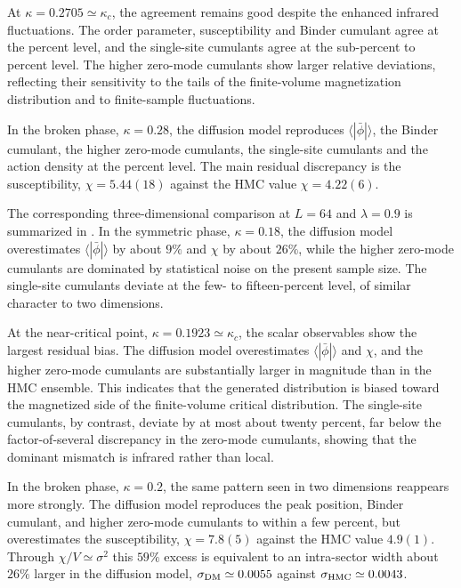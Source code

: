 \documentclass[reprint,twocolumn,superscriptaddress,preprintnumbers,amsmath,amssymb,aps,prd,floatfix]{revtex4-2}
\begin{document}
At $\kappa=0.2705\simeq\kappa_c$, the agreement remains good despite the enhanced infrared fluctuations. The order parameter, susceptibility and Binder cumulant agree at the percent level, and the single-site cumulants agree at the sub-percent to percent level. The higher zero-mode cumulants show larger relative deviations, reflecting their sensitivity to the tails of the finite-volume magnetization distribution and to finite-sample fluctuations.

In the broken phase, $\kappa=0.28$, the diffusion model reproduces $\langle|\bar\phi|\rangle$, the Binder cumulant, the higher zero-mode cumulants, the single-site cumulants and the action density at the percent level. The main residual discrepancy is the susceptibility, $\chi=5.44(18)$ against the HMC value $\chi=4.22(6)$.

The corresponding three-dimensional comparison at $L=64$ and $\lambda=0.9$ is summarized in . In the symmetric phase, $\kappa=0.18$, the diffusion model overestimates $\langle|\bar\phi|\rangle$ by about $9\%$ and $\chi$ by about $26\%$, while the higher zero-mode cumulants are dominated by statistical noise on the present sample size. The single-site cumulants deviate at the few- to fifteen-percent level, of similar character to two dimensions.

At the near-critical point, $\kappa=0.1923\simeq\kappa_c$, the scalar observables show the largest residual bias. The diffusion model overestimates $\langle|\bar\phi|\rangle$ and $\chi$, and the higher zero-mode cumulants are substantially larger in magnitude than in the HMC ensemble. This indicates that the generated distribution is biased toward the magnetized side of the finite-volume critical distribution. The single-site cumulants, by contrast, deviate by at most about twenty percent, far below the factor-of-several discrepancy in the zero-mode cumulants, showing that the dominant mismatch is infrared rather than local.

In the broken phase, $\kappa=0.2$, the same pattern seen in two dimensions reappears more strongly. The diffusion model reproduces the peak position, Binder cumulant, and higher zero-mode cumulants to within a few percent, but overestimates the susceptibility, $\chi=7.8(5)$ against the HMC value $4.9(1)$. Through $\chi/V\simeq\sigma^2$ this $59\%$ excess is equivalent to an intra-sector width about $26\%$ larger in the diffusion model, $\sigma_{\rm DM}\simeq0.0055$ against $\sigma_{\rm HMC}\simeq0.0043$.
\end{document}
